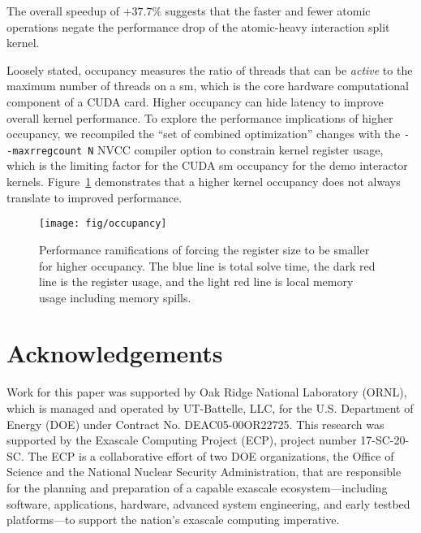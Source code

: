 \documentclass{webofc}
\begin{document}
The overall speedup of $+37.7\%$ suggests that the faster and fewer atomic
operations negate the performance drop of the atomic-heavy interaction split
kernel.

Loosely stated, occupancy measures the ratio of threads that can be
\emph{active} to the maximum number of threads on a \ac{sm},
which is the core hardware computational component of a CUDA card. Higher
occupancy can hide latency to improve overall kernel performance.
To explore the performance implications of higher occupancy, we recompiled the
``set of combined optimization'' changes with the \verb|--maxrregcount N| NVCC
compiler option to constrain kernel register usage,
which is the limiting factor for the CUDA \ac{sm} occupancy for the demo
interactor kernels. Figure~\ref{fig:occupancy} demonstrates that a higher
kernel occupancy does not always translate to improved performance.

\begin{figure}[htb]
  \centering
  \texttt{[image: fig/occupancy]}
  \caption{Performance ramifications of forcing the register size to be smaller
  for higher occupancy. The blue line is total solve time, the dark red line is
the register usage, and the light red line is local memory usage including
memory spills.}
  \label{fig:occupancy}
\end{figure}

\section{Acknowledgements}

Work for this paper was supported by Oak Ridge National Laboratory (ORNL), which is managed and operated by UT-Battelle, LLC, for the U.S. Department of Energy (DOE) under Contract No. DEAC05-00OR22725.
This research was supported by the Exascale Computing
Project (ECP), project number 17-SC-20-SC. The ECP is a collaborative effort of
two DOE organizations, the Office of Science and the National Nuclear Security
Administration, that are responsible for the planning and preparation of a
capable exascale ecosystem---including software, applications, hardware,
advanced system engineering, and early testbed platforms---to support the
nation's exascale computing imperative.


\end{document}
